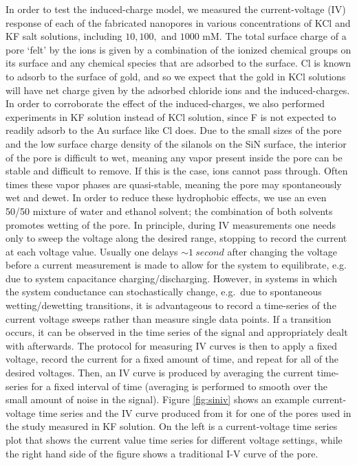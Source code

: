 		
			In order to test the induced-charge model, we measured the current-voltage (IV) response of each of the fabricated nanopores in various concentrations of KCl and KF salt solutions, including $10, 100,$ and $1000$ mM. The total surface charge of a pore `felt' by the ions is given by a combination of the ionized chemical groups on its surface and any chemical species that are adsorbed to the surface. Cl is known to adsorb to the surface of gold, and so we expect that the gold in KCl solutions will have net charge given by the adsorbed chloride ions and the induced-charges. In order to corroborate the effect of the induced-charges, we also performed experiments in KF solution instead of KCl solution, since F is not expected to readily adsorb to the Au surface like Cl does. Due to the small sizes of the pore and the low surface charge density of the silanols on the SiN surface, the interior of the pore is difficult to wet, meaning any vapor present inside the pore can be stable and difficult to remove. If this is the case, ions cannot pass through. Often times these vapor phases are quasi-stable, meaning the pore may spontaneously wet and dewet. In order to reduce these hydrophobic effects, we use an even 50/50 mixture of water and ethanol solvent; the combination of both solvents promotes wetting of the pore. In principle, during IV measurements one needs only to sweep the voltage along the desired range, stopping to record the current at each voltage value. Usually one delays $\sim\SI{1}{second}$ after changing the voltage before a current measurement is made to allow for the system to equilibrate, e.g. due to system capacitance charging/discharging. However, in systems in which the system conductance can stochastically change, e.g.~due to spontaneous wetting/dewetting transitions, it is advantageous to record a time-series of the current voltage sweeps rather than measure single data points. If a transition occurs, it can be observed in the time series of the signal and appropriately dealt with afterwards. The protocol for measuring IV curves is then to apply a fixed voltage, record the current for a fixed amount of time, and repeat for all of the desired voltages. Then, an IV curve is produced by averaging the current time-series for a fixed interval of time (averaging is performed to smooth over the small amount of noise in the signal).  Figure \ref{fig:siniv} shows an example current-voltage time series and the IV curve produced from it for one of the pores used in the study measured in KF solution. On the left is a current-voltage time series plot that shows the current value time series for different voltage settings, while the right hand side of the figure shows a traditional I-V curve of the pore.  
			
			
			
			
		
			
		
			
	
		
		
		
		
	

	




